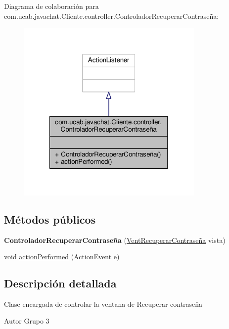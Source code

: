 Diagrama de colaboración para com.\-ucab.\-javachat.\-Cliente.\-controller.\-Controlador\-Recuperar\-Contraseña\-:
\nopagebreak
\begin{figure}[H]
\begin{center}
\leavevmode
\includegraphics[width=258pt]{d1/def/classcom_1_1ucab_1_1javachat_1_1_cliente_1_1controller_1_1_controlador_recuperar_contrase_xC3_xB1a__coll__graph}
\end{center}
\end{figure}
\subsection*{Métodos públicos}
\begin{DoxyCompactItemize}
\item 
\hypertarget{classcom_1_1ucab_1_1javachat_1_1_cliente_1_1controller_1_1_controlador_recuperar_contrase_xC3_xB1a_a9bf650dbd9bd8af042b92a43baa80111}{{\bfseries Controlador\-Recuperar\-Contraseña} (\hyperlink{classcom_1_1ucab_1_1javachat_1_1_cliente_1_1view_1_1_vent_recuperar_contrase_xC3_xB1a}{Vent\-Recuperar\-Contraseña} vista)}\label{classcom_1_1ucab_1_1javachat_1_1_cliente_1_1controller_1_1_controlador_recuperar_contrase_xC3_xB1a_a9bf650dbd9bd8af042b92a43baa80111}

\item 
void \hyperlink{classcom_1_1ucab_1_1javachat_1_1_cliente_1_1controller_1_1_controlador_recuperar_contrase_xC3_xB1a_a3e2d23c7eea7fa3a47b41cb6638d2335}{action\-Performed} (Action\-Event e)
\end{DoxyCompactItemize}


\subsection{Descripción detallada}
Clase encargada de controlar la ventana de Recuperar contraseña \begin{DoxyAuthor}{Autor}
Grupo 3 
\end{DoxyAuthor}


